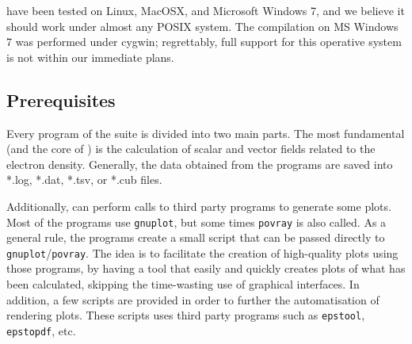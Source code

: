 \DTK{} have been tested on Linux, MacOSX, and Microsoft Windows 7, and we believe it should
work under almost any POSIX system. The compilation on MS Windows 7 was performed under cygwin;
regrettably, full support for this operative system is not within our immediate plans.

\subsection{Prerequisites}

Every program of the suite \DTK{} is divided into two main parts. The most fundamental
(and the core of \DTK) is the calculation of scalar and vector fields related to the electron
density. Generally, the data obtained from the programs are saved into *.log, *.dat, *.tsv,
or *.cub files. 

Additionally, \DTK{} can perform calls to third party programs to generate some plots.
Most of the programs use \texttt{gnuplot}, but some times \texttt{povray} is also called.
As a general rule, the programs create a small script that can be passed directly to
\texttt{gnuplot}/\texttt{povray}. The idea is to facilitate the creation of
high-quality plots using those programs, by having a tool that easily and 
quickly creates plots
of what has been calculated, skipping the time-wasting use of graphical interfaces.
In addition, a few scripts are provided in order to further the automatisation of
rendering plots. These scripts uses third party programs such as \texttt{epstool},
\texttt{epstopdf}, etc.

